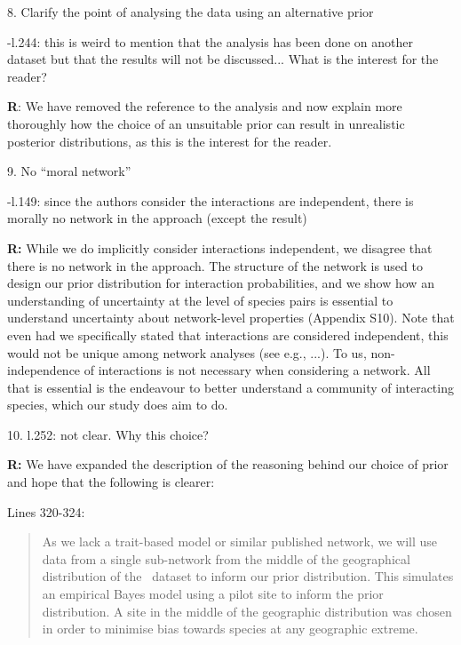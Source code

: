 \documentclass[12pt]{letter}
\newenvironment{refquote}{\bigskip \begin{it}}{\end{it}\smallskip}
\begin{document}
	8. Clarify the point of analysing the data using an alternative prior 

		
		\begin{refquote}	
			-l.244: this is weird to mention that the analysis has been done on another dataset but that the results will not be discussed... What is the interest for the reader?
		\end{refquote}


		\textbf{R}: We have removed the reference to the analysis and now explain more thoroughly how the choice of an unsuitable prior can result in unrealistic posterior distributions, as this is the interest for the reader.


	9. No ``moral network'' 


		\begin{refquote}
			-l.149: since the authors consider the interactions are independent, there is morally no network in the approach (except the result)
		\end{refquote}


		\textbf{R:} While we do implicitly consider interactions independent, we disagree that there is no network in the approach. The structure of the network is used to design our prior distribution for interaction probabilities, and we show how an understanding of uncertainty at the level of species pairs is essential to understand uncertainty about network-level properties (Appendix S10). Note that even had we specifically stated that interactions are considered independent, this would not be unique among network analyses (see e.g., ...). To us, non-independence of interactions is not necessary when considering a network. All that is essential is the endeavour to better understand a community of interacting species, which our study does aim to do. 


	10. l.252: not clear. Why this choice?


		\textbf{R:} We have expanded the description of the reasoning behind our choice of prior and hope that the following is clearer:


		Lines 320-324:


		\begin{quotation}
			As we lack a trait-based model or similar published network, we will use data from a single sub-network from the middle of the geographical distribution of the~\citet{Kopelke2017} dataset to inform our prior distribution. This simulates an empirical Bayes model using a pilot site to inform the prior distribution. A site in the middle of the geographic distribution was chosen in order to minimise bias towards species at any geographic extreme.
		\end{quotation}
\end{document}
